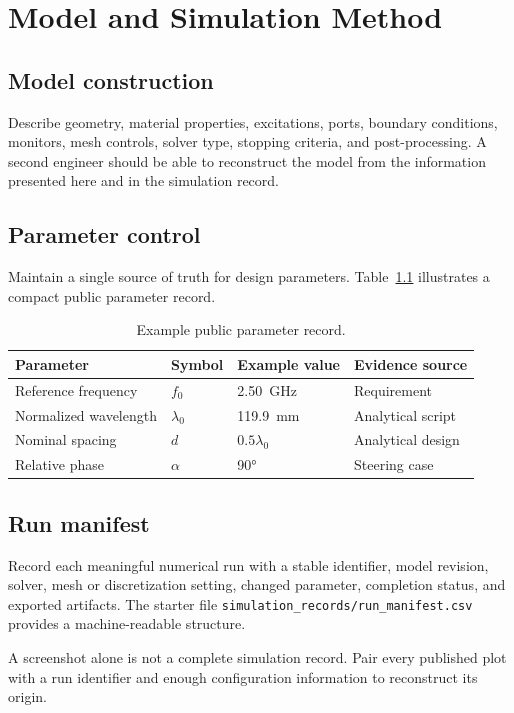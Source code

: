 \chapter{Model and Simulation Method}

\section{Model construction}
Describe geometry, material properties, excitations, ports, boundary conditions,
monitors, mesh controls, solver type, stopping criteria, and post-processing. A second
engineer should be able to reconstruct the model from the information presented here
and in the simulation record.

\section{Parameter control}
Maintain a single source of truth for design parameters. Table~\ref{tab:parameters}
illustrates a compact public parameter record.

\begin{table}[H]
\centering
\caption{Example public parameter record.}
\label{tab:parameters}
\begin{tabular}{llll}
\toprule
Parameter & Symbol & Example value & Evidence source \\
\midrule
Reference frequency & $f_0$ & \SI{2.50}{\giga\hertz} & Requirement \\
Normalized wavelength & $\lambda_0$ & \SI{119.9}{\milli\meter} & Analytical script \\
Nominal spacing & $d$ & $0.5\lambda_0$ & Analytical design \\
Relative phase & $\alpha$ & \ang{90} & Steering case \\
\bottomrule
\end{tabular}
\end{table}

\section{Run manifest}
Record each meaningful numerical run with a stable identifier, model revision, solver,
mesh or discretization setting, changed parameter, completion status, and exported
artifacts. The starter file \texttt{simulation\_records/run\_manifest.csv} provides a
machine-readable structure.

\begin{simulatedevidencebox}
A screenshot alone is not a complete simulation record. Pair every published plot with
a run identifier and enough configuration information to reconstruct its origin.
\end{simulatedevidencebox}
